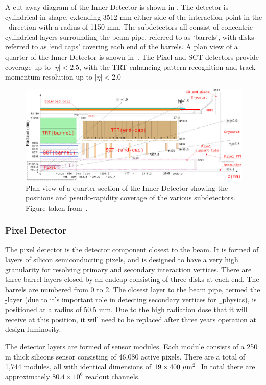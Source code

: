 A cut-away diagram of the Inner Detector is shown in . The detector
is cylindrical in shape, extending 3512 mm either side of the interaction point
in the \z\ direction with a radius of 1150 mm. The subdetectors all consist of
concentric cylindrical layers surrounding the beam pipe, referred to as
`barrels', with disks referred to as `end caps' covering each end of the
barrels. A plan view of a quarter of the Inner Detector is shown
in~. The Pixel and SCT detectors provide coverage up to $|\eta|<2.5$,
with the TRT enhancing pattern recognition and track momentum resolution up to
$|\eta|<2.0$

\begin{figure}[h]
\centering
\includegraphics[width=\textwidth]{FigID26-mod-011107_crop}
\caption{Plan view of a quarter section of the Inner Detector showing the
positions and pseudo-rapidity coverage of the various subdetectors. Figure taken from~\cite{Aad:1125884}.}
\label{fig:id-plan}
\end{figure}

\subsubsection{Pixel Detector}

The pixel detector is the detector component closest to the beam. It is formed
of layers of silicon semiconducting pixels, and is designed to have a very
high granularity for resolving primary and secondary interaction vertices. There
are three barrel layers closed by an endcap consisting of three disks at each
end. The barrels are numbered from 0 to 2. The closest layer to the beam
pipe, termed the \b-layer (due to it's important role in detecting secondary
vertices for \b\ physics), is
positioned at a radius of 50.5 mm. Due to the high radiation dose that it will receive at this position, it will need to be replaced after three years
operation at design luminosity.

The detector layers are formed of sensor modules. Each module consists of a 250 \micro m thick
silicons sensor consisting of 46,080 active pixels. There are a total of 1,744
modules, all with identical dimensions of $19\times400~\mu \rm{m}^{2}$. In total
there are approximately $80.4\times 10^{6}$ readout channels.

